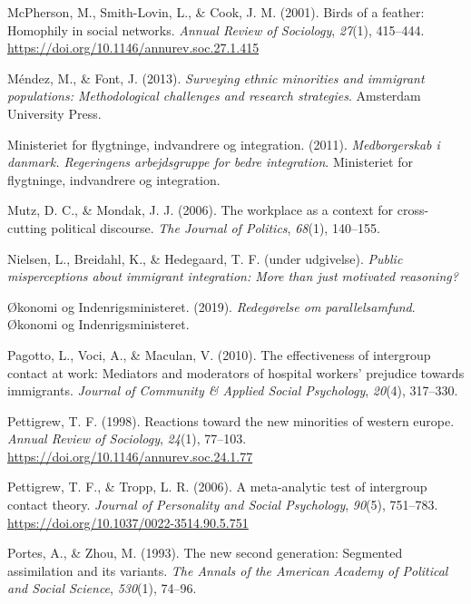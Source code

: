 \documentclass[
]{book}
\newlength{\cslhangindent}
\newenvironment{CSLReferences}[2] %
 {\begin{list}{}{%
  \setlength{\itemindent}{0pt}
  \setlength{\leftmargin}{0pt}
  \setlength{\parsep}{0pt}
  \ifodd #1
   \setlength{\leftmargin}{\cslhangindent}
   \setlength{\itemindent}{-1\cslhangindent}
  \fi
  \setlength{\itemsep}{#2\baselineskip}}}
 {\end{list}}
\begin{document}
\begin{CSLReferences}{1}{0}
McPherson, M., Smith-Lovin, L., \& Cook, J. M. (2001). Birds of a feather: Homophily in social networks. \emph{Annual Review of Sociology}, \emph{27}(1), 415--444. \url{https://doi.org/10.1146/annurev.soc.27.1.415}

Méndez, M., \& Font, J. (2013). \emph{Surveying ethnic minorities and immigrant populations: Methodological challenges and research strategies}. Amsterdam University Press.

Ministeriet for flygtninge, indvandrere og integration. (2011). \emph{Medborgerskab i danmark. Regeringens arbejdsgruppe for bedre integration}. Ministeriet for flygtninge, indvandrere og integration.

Mutz, D. C., \& Mondak, J. J. (2006). The workplace as a context for cross-cutting political discourse. \emph{The Journal of Politics}, \emph{68}(1), 140--155.

Nielsen, L., Breidahl, K., \& Hedegaard, T. F. (under udgivelse). \emph{Public misperceptions about immigrant integration: More than just motivated reasoning?}

Økonomi og Indenrigsministeret. (2019). \emph{Redegørelse om parallelsamfund}. {Økonomi og Indenrigsministeret}.

Pagotto, L., Voci, A., \& Maculan, V. (2010). The effectiveness of intergroup contact at work: Mediators and moderators of hospital workers' prejudice towards immigrants. \emph{Journal of Community \& Applied Social Psychology}, \emph{20}(4), 317--330.

Pettigrew, T. F. (1998). Reactions toward the new minorities of western europe. \emph{Annual Review of Sociology}, \emph{24}(1), 77--103. \url{https://doi.org/10.1146/annurev.soc.24.1.77}

Pettigrew, T. F., \& Tropp, L. R. (2006). A meta-analytic test of intergroup contact theory. \emph{Journal of Personality and Social Psychology}, \emph{90}(5), 751--783. \url{https://doi.org/10.1037/0022-3514.90.5.751}

Portes, A., \& Zhou, M. (1993). The new second generation: Segmented assimilation and its variants. \emph{The Annals of the American Academy of Political and Social Science}, \emph{530}(1), 74--96.


\end{CSLReferences}
\end{document}
